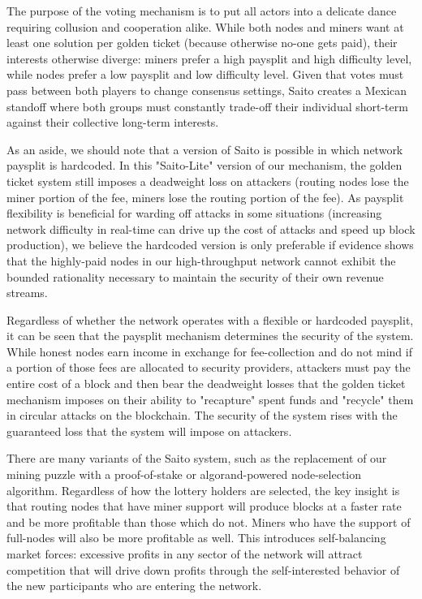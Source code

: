 \documentclass[11.5pt, oneside]{article}   	%
\begin{document}
\begin{multicols}{2}
The purpose of the voting mechanism is to put all actors into a delicate dance requiring collusion and cooperation alike. While both nodes and miners want at least one solution per golden ticket (because otherwise no-one gets paid), their interests otherwise diverge: miners prefer a high paysplit and high difficulty level, while nodes prefer a low paysplit and low difficulty level. Given that votes must pass between both players to change consensus settings, Saito creates a Mexican standoff where both groups must constantly trade-off their individual short-term against their collective long-term interests.

As an aside, we should note that a version of Saito is possible in which network paysplit is hardcoded. In this "Saito-Lite" version of our mechanism, the golden ticket system still imposes a deadweight loss on attackers (routing nodes lose the miner portion of the fee, miners lose the routing portion of the fee). As paysplit flexibility is beneficial for warding off attacks in some situations (increasing network difficulty in real-time can drive up the cost of attacks and speed up block production), we believe the hardcoded version is only preferable if evidence shows that the highly-paid nodes in our high-throughput network cannot exhibit the bounded rationality necessary to maintain the security of their own revenue streams.

Regardless of whether the network operates with a flexible or hardcoded paysplit, it can be seen that the paysplit mechanism determines the security of the system. While honest nodes earn income in exchange for fee-collection and do not mind if a portion of those fees are allocated to security providers, attackers must pay the entire cost of a block and then bear the deadweight losses that the golden ticket mechanism imposes on their ability to "recapture" spent funds and "recycle" them in circular attacks on the blockchain. The security of the system rises with the guaranteed loss that the system will impose on attackers.

There are many variants of the Saito system, such as the replacement of our mining puzzle with a proof-of-stake or algorand-powered node-selection algorithm. Regardless of how the lottery holders are selected, the key insight is that routing nodes that have miner support will produce blocks at a faster rate and be more profitable than those which do not. Miners who have the support of full-nodes will also be more profitable as well. This introduces self-balancing market forces: excessive profits in any sector of the network will attract competition that will drive down profits through the self-interested behavior of the new participants who are entering the network.


\end{multicols}
\end{document}
